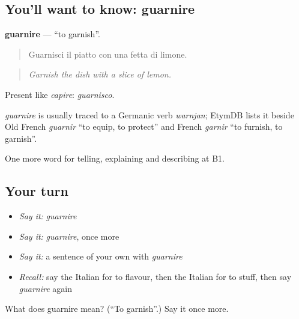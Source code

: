\subsection*{You'll want to know: guarnire}
\textbf{guarnire} — \textquotedblleft{}to garnish\textquotedblright{}.

\begin{quote}
Guarnisci il piatto con una fetta di limone.
\end{quote}

\begin{quote}
\emph{Garnish the dish with a slice of lemon.}
\end{quote}

Present like \emph{capire}: \emph{guarnisco}.

\begin{cousinweb}
\emph{guarnire} is usually traced to a Germanic verb \emph{warnjan}; EtymDB lists it beside Old French \emph{guarnir} \textquotedblleft{}to equip, to protect\textquotedblright{} and French \emph{garnir} \textquotedblleft{}to furnish, to garnish\textquotedblright{}.
\end{cousinweb}

\begin{grammarlens}[title={What you've built}]
One more word for telling, explaining and describing at B1.
\end{grammarlens}

\subsection*{Your turn}
\begin{itemize}
\raggedright
  \item \emph{Say it:} \emph{guarnire}
  \item \emph{Say it:} \emph{guarnire}, once more
  \item \emph{Say it:} a sentence of your own with \emph{guarnire}
  \item \emph{Recall:} say the Italian for to flavour, then the Italian for to stuff, then say \emph{guarnire} again
\end{itemize}

\begin{tcolorbox}[breakable,colback=teal!4,colframe=teal!35!black,title={Before you move on}]
What does guarnire mean? (\textquotedblleft{}To garnish\textquotedblright{}.) Say it once more.
\end{tcolorbox}
